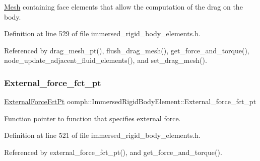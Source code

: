 \hyperlink{classoomph_1_1Mesh}{Mesh} containing face elements that allow the computation of the drag on the body. 



Definition at line 529 of file immersed\+\_\+rigid\+\_\+body\+\_\+elements.\+h.



Referenced by drag\+\_\+mesh\+\_\+pt(), flush\+\_\+drag\+\_\+mesh(), get\+\_\+force\+\_\+and\+\_\+torque(), node\+\_\+update\+\_\+adjacent\+\_\+fluid\+\_\+elements(), and set\+\_\+drag\+\_\+mesh().

\mbox{\label{classoomph_1_1ImmersedRigidBodyElement_aac35cbe02cabee08a706aadd03af801a}} 
\subsubsection{\texorpdfstring{External\+\_\+force\+\_\+fct\+\_\+pt}{External\_force\_fct\_pt}}
{\footnotesize\ttfamily \hyperlink{classoomph_1_1ImmersedRigidBodyElement_a7a43bfd54213becfb135b594720b0539}{External\+Force\+Fct\+Pt} oomph\+::\+Immersed\+Rigid\+Body\+Element\+::\+External\+\_\+force\+\_\+fct\+\_\+pt\hspace{0.3cm}{\ttfamily [private]}}



Function pointer to function that specifies external force. 



Definition at line 521 of file immersed\+\_\+rigid\+\_\+body\+\_\+elements.\+h.



Referenced by external\+\_\+force\+\_\+fct\+\_\+pt(), and get\+\_\+force\+\_\+and\+\_\+torque().

\mbox{\label{classoomph_1_1ImmersedRigidBodyElement_a4061f0ed0ea1ca3a8d0b618664ce889a}} 
